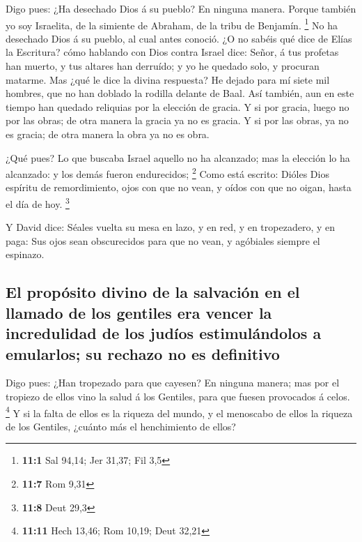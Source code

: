  Digo pues: ¿Ha desechado Dios á su pueblo? En ninguna
manera. Porque también yo soy Israelita, de la simiente de Abraham, de
la tribu de Benjamín. \footnote{\textbf{11:1} Sal 94,14; Jer 31,37; Fil
  3,5}  No ha desechado Dios á su pueblo, al cual antes
conoció. ¿O no sabéis qué dice de Elías la Escritura? cómo hablando con
Dios contra Israel dice:  Señor, á tus profetas han muerto,
y tus altares han derruído; y yo he quedado solo, y procuran matarme.
 Mas ¿qué le dice la divina respuesta? He dejado para mí
siete mil hombres, que no han doblado la rodilla delante de Baal.
 Así también, aun en este tiempo han quedado reliquias por
la elección de gracia.  Y si por gracia, luego no por las
obras; de otra manera la gracia ya no es gracia. Y si por las obras, ya
no es gracia; de otra manera la obra ya no es obra.

 ¿Qué pues? Lo que buscaba Israel aquello no ha alcanzado;
mas la elección lo ha alcanzado: y los demás fueron endurecidos;
\footnote{\textbf{11:7} Rom 9,31}  Como está escrito: Dióles
Dios espíritu de remordimiento, ojos con que no vean, y oídos con que no
oigan, hasta el día de hoy. \footnote{\textbf{11:8} Deut 29,3}

 Y David dice: Séales vuelta su mesa en lazo, y en red, y en
tropezadero, y en paga:  Sus ojos sean obscurecidos para
que no vean, y agóbiales siempre el espinazo.

\hypertarget{el-propuxf3sito-divino-de-la-salvaciuxf3n-en-el-llamado-de-los-gentiles-era-vencer-la-incredulidad-de-los-juduxedos-estimuluxe1ndolos-a-emularlos-su-rechazo-no-es-definitivo}{%
\subsection{El propósito divino de la salvación en el llamado de los
gentiles era vencer la incredulidad de los judíos estimulándolos a
emularlos; su rechazo no es
definitivo}\label{el-propuxf3sito-divino-de-la-salvaciuxf3n-en-el-llamado-de-los-gentiles-era-vencer-la-incredulidad-de-los-juduxedos-estimuluxe1ndolos-a-emularlos-su-rechazo-no-es-definitivo}}

 Digo pues: ¿Han tropezado para que cayesen? En ninguna
manera; mas por el tropiezo de ellos vino la salud á los Gentiles, para
que fuesen provocados á celos. \footnote{\textbf{11:11} Hech 13,46; Rom
  10,19; Deut 32,21}  Y si la falta de ellos es la riqueza
del mundo, y el menoscabo de ellos la riqueza de los Gentiles, ¿cuánto
más el henchimiento de ellos?


